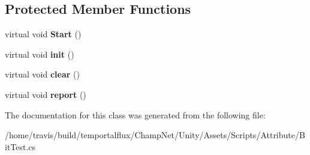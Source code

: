 \subsection*{Protected Member Functions}
\begin{DoxyCompactItemize}
\item 
\hypertarget{class_bit_test_a81fd6bebd651795b30f23b205a7ce79f}{virtual void {\bfseries Start} ()}\label{class_bit_test_a81fd6bebd651795b30f23b205a7ce79f}

\item 
\hypertarget{class_bit_test_ac49a2993eb35b03b3561ddfb1b32f6d5}{virtual void {\bfseries init} ()}\label{class_bit_test_ac49a2993eb35b03b3561ddfb1b32f6d5}

\item 
\hypertarget{class_bit_test_a6eda8a30b79abab4df75e29ced2c0414}{virtual void {\bfseries clear} ()}\label{class_bit_test_a6eda8a30b79abab4df75e29ced2c0414}

\item 
\hypertarget{class_bit_test_a5d54bc8fb0b5cccac811fe2ecb29a449}{virtual void {\bfseries report} ()}\label{class_bit_test_a5d54bc8fb0b5cccac811fe2ecb29a449}

\end{DoxyCompactItemize}


The documentation for this class was generated from the following file\-:\begin{DoxyCompactItemize}
\item 
/home/travis/build/temportalflux/\-Champ\-Net/\-Unity/\-Assets/\-Scripts/\-Attribute/Bit\-Test.\-cs\end{DoxyCompactItemize}
